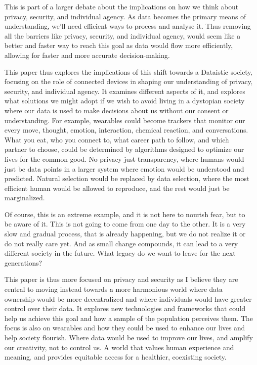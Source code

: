 This is part of a larger debate about the implications on how we think about privacy, security, and individual agency. As data becomes the primary means of understanding, we'll need efficient ways to process and analyse it. Thus removing all the barriers like privacy, security, and individual agency, would seem like a better and faster way to reach this goal as data would flow more efficiently, allowing for faster and more accurate decision-making. 

This paper thus explores the implications of this shift towards a Dataistic society, focusing on the role of connected devices in shaping our understanding of privacy, security, and individual agency. It examines different aspects of it, and explores what solutions we might adopt if we wish to avoid living in a dystopian society where our data is used to make decisions about us without our consent or understanding. For example, wearables could become trackers that monitor our every move, thought, emotion, interaction, chemical reaction, and conversations. What you eat, who you connect to, what career path to follow, and which partner to choose, could be determined by algorithms designed to optimize our lives for the common good. No privacy just transparency, where humans would just be data points in a larger system where emotion would be understood and predicted. Natural selection would be replaced by data selection, where the most efficient human would be allowed to reproduce, and the rest would just be marginalized.

Of course, this is an extreme example, and it is not here to nourish fear, but to be aware of it. This is not going to come from one day to the other. It is a very slow and gradual process, that is already happening, but we do not realize it or do not really care yet. And as small change compounds, it can lead to a very different society in the future. What legacy do we want to leave for the next generations? 

This paper is thus more focused on privacy and security as I believe they are central to moving instead towards a more harmonious world where data ownership would be more decentralized and where individuals would have greater control over their data. It explores new technologies and frameworks that could help us achieve this goal and how a sample of the population perceives them. The focus is also on wearables and how they could be used to enhance our lives and help society flourish. Where data would be used to improve our lives, and amplify our creativity, not to control us. A world that values human experience and meaning, and provides equitable access for a healthier, coexisting society.


